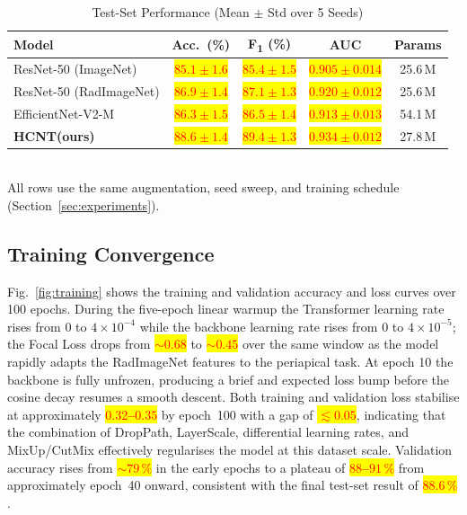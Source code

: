 \documentclass[conference]{IEEEtran}
\newcommand{\HCNT}{\textsc{HCNT}\xspace}
\newcommand{\RESULT}[1]{\colorbox{yellow}{\textcolor{red}{\textbf{#1}}}}
\begin{document}
\begin{table}[t]
  \centering
  \caption{Test-Set Performance (Mean $\pm$ Std over 5 Seeds)}
  \label{tab:results}
  \renewcommand{\arraystretch}{1.25}
  \begin{tabular}{lcccc}
    \toprule
    \textbf{Model}
      & \textbf{Acc.\ (\%)}
      & \textbf{F\textsubscript{1} (\%)}
      & \textbf{AUC}
      & \textbf{Params} \\
    \midrule
    ResNet-50 (ImageNet)
      & \RESULT{$85.1\pm1.6$} & \RESULT{$85.4\pm1.5$} & \RESULT{$0.905\pm0.014$} & 25.6\,M \\
    ResNet-50 (RadImageNet)
      & \RESULT{$86.9\pm1.4$} & \RESULT{$87.1\pm1.3$} & \RESULT{$0.920\pm0.012$} & 25.6\,M \\
    EfficientNet-V2-M
      & \RESULT{$86.3\pm1.5$} & \RESULT{$86.5\pm1.4$} & \RESULT{$0.913\pm0.013$} & 54.1\,M \\
    \textbf{\HCNT (ours)}
      & \RESULT{$\mathbf{88.6\pm1.4}$} & \RESULT{$\mathbf{89.4\pm1.3}$}
      & \RESULT{$\mathbf{0.934\pm0.012}$} & 27.8\,M \\
    \bottomrule
  \end{tabular}
  \medskip\\
  \small All rows use the same augmentation, seed sweep, and training
  schedule (Section~\ref{sec:experiments}). %
\end{table}

\subsection{Training Convergence}

Fig.~\ref{fig:training} shows the training and validation accuracy and
loss curves over 100 epochs. During the five-epoch linear warmup the
Transformer learning rate rises from $0$ to $4\!\times\!10^{-4}$ while the
backbone learning rate rises from $0$ to $4\!\times\!10^{-5}$; the Focal
Loss drops from \RESULT{${\sim}0.68$} to \RESULT{${\sim}0.45$} over the same window as the
model rapidly adapts the RadImageNet features to the periapical task. At
epoch 10 the backbone is fully unfrozen, producing a brief and expected
loss bump before the cosine decay resumes a smooth descent. Both training
and validation loss stabilise at approximately \RESULT{$0.32$--$0.35$} by epoch~100
with a gap of \RESULT{$\lesssim 0.05$}, indicating that the combination of DropPath,
LayerScale, differential learning rates, and MixUp/CutMix effectively
regularises the model at this dataset scale. Validation accuracy rises
from \RESULT{${\sim}79\,\%$} in the early epochs to a plateau of \RESULT{$88$--$91\,\%$}
from approximately epoch~40 onward, consistent with the final test-set
result of \RESULT{$88.6\,\%$}.
\end{document}
